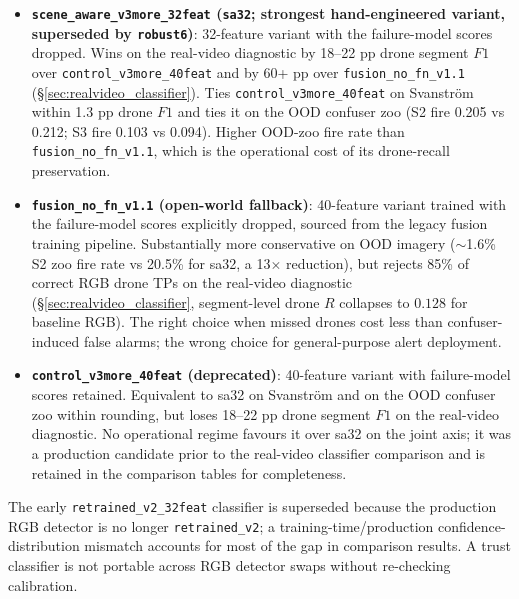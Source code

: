 \begin{itemize}
    \item \textbf{\texttt{scene\_aware\_v3more\_32feat} (\texttt{sa32}; strongest hand-engineered variant, superseded by \texttt{robust6})}: 32-feature variant with the failure-model scores dropped. Wins on the real-video diagnostic by 18--22 pp drone segment $F1$ over \texttt{control\_v3more\_40feat} and by 60+ pp over \texttt{fusion\_no\_fn\_v1.1} (\S\ref{sec:realvideo_classifier}). Ties \texttt{control\_v3more\_40feat} on Svanstr\"om within 1.3 pp drone $F1$ and ties it on the OOD confuser zoo (S2 fire 0.205 vs 0.212; S3 fire 0.103 vs 0.094). Higher OOD-zoo fire rate than \texttt{fusion\_no\_fn\_v1.1}, which is the operational cost of its drone-recall preservation.
    \item \textbf{\texttt{fusion\_no\_fn\_v1.1} (open-world fallback)}: 40-feature variant trained with the failure-model scores explicitly dropped, sourced from the legacy fusion training pipeline. Substantially more conservative on OOD imagery ($\sim$1.6\% S2 zoo fire rate vs 20.5\% for sa32, a 13$\times$ reduction), but rejects 85\% of correct RGB drone TPs on the real-video diagnostic (\S\ref{sec:realvideo_classifier}, segment-level drone $R$ collapses to $0.128$ for baseline RGB). The right choice when missed drones cost less than confuser-induced false alarms; the wrong choice for general-purpose alert deployment.
    \item \textbf{\texttt{control\_v3more\_40feat} (deprecated)}: 40-feature variant with failure-model scores retained. Equivalent to sa32 on Svanstr\"om and on the OOD confuser zoo within rounding, but loses 18--22 pp drone segment $F1$ on the real-video diagnostic. No operational regime favours it over sa32 on the joint axis; it was a production candidate prior to the real-video classifier comparison and is retained in the comparison tables for completeness.
\end{itemize}

The early \texttt{retrained\_v2\_32feat} classifier is superseded because the production RGB detector is no longer \texttt{retrained\_v2}; a training-time/production confidence-distribution mismatch accounts for most of the gap in comparison results. A trust classifier is not portable across RGB detector swaps without re-checking calibration.

